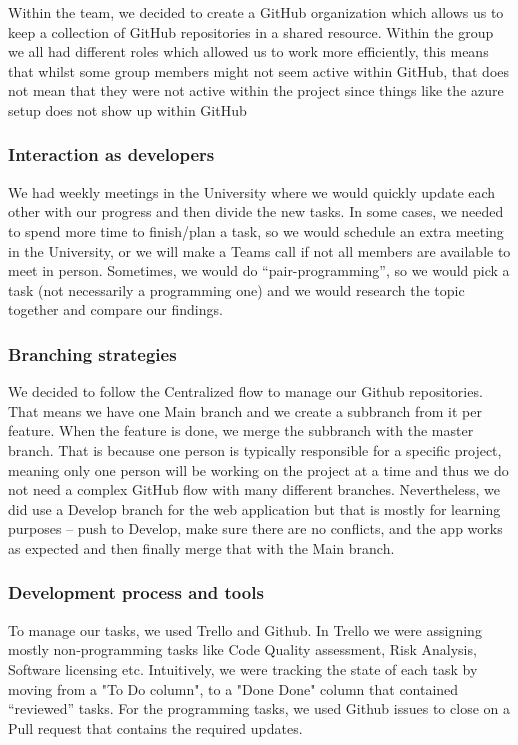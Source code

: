      Within the team, we decided to create a GitHub organization which allows us to keep a collection of GitHub repositories in a shared resource. Within the group we all had different roles which allowed us to work more efficiently, this means that whilst some group members might not seem active within GitHub, that does not mean that they were not active within the project since things like the azure setup does not show up within GitHub
     
     \subsubsection{Interaction as developers}
     We had weekly meetings in the University where we would quickly update each other with our progress and then divide the new tasks. In some cases, we needed to spend more time to finish/plan a task, so we would schedule an extra meeting in the University, or we will make a Teams call if not all members are available to meet in person. Sometimes, we would do “pair-programming”, so we would pick a task (not necessarily a programming one) and we would research the topic together and compare our findings. 
     
    \subsubsection{Branching strategies}
    We decided to follow the Centralized flow to manage our Github repositories. That means we have one Main branch and we create a subbranch from it per feature. When the feature is done, we merge the subbranch with the master branch. That is because one person is typically responsible for a specific project, meaning only one person will be working on the project at a time and thus we do not need a complex GitHub flow with many different branches. Nevertheless, we did use a Develop branch for the web application but that is mostly for learning purposes – push to Develop, make sure there are no conflicts, and the app works as expected and then finally merge that with the Main branch.
    
    \subsubsection{Development process and tools}
    To manage our tasks, we used Trello and Github. In Trello we were assigning mostly non-programming tasks like Code Quality assessment, Risk Analysis, Software licensing etc. Intuitively, we were tracking the state of each task by moving from a "To Do column", to a "Done Done" column that contained “reviewed” tasks. For the programming tasks, we used Github issues to close on a Pull request that contains the required updates. 
     
     